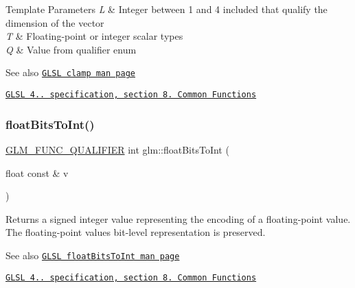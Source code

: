 \begin{DoxyTemplParams}{Template Parameters}
{\em L} & Integer between 1 and 4 included that qualify the dimension of the vector \\
\hline
{\em T} & Floating-\/point or integer scalar types \\
\hline
{\em Q} & Value from qualifier enum\\
\hline
\end{DoxyTemplParams}
\begin{DoxySeeAlso}{See also}
\href{http://www.opengl.org/sdk/docs/manglsl/xhtml/clamp.xml}{\tt G\+L\+SL clamp man page} 

\href{http://www.opengl.org/registry/doc/GLSLangSpec.4.20.8.pdf}{\tt G\+L\+SL 4.. specification, section 8. Common Functions} 
\end{DoxySeeAlso}
\mbox{\label{group__core__func__common_gadc6a536a7bef046c3293d2ccad6d9ca2}} 
\subsubsection{\texorpdfstring{float\+Bits\+To\+Int()}{floatBitsToInt()}\hspace{0.1cm}{\footnotesize\ttfamily [1/2]}}
{\footnotesize\ttfamily \hyperlink{setup_8hpp_a33fdea6f91c5f834105f7415e2a64407}{G\+L\+M\+\_\+\+F\+U\+N\+C\+\_\+\+Q\+U\+A\+L\+I\+F\+I\+ER} int glm\+::float\+Bits\+To\+Int (\begin{DoxyParamCaption}\item[{float const \&}]{v }\end{DoxyParamCaption})}

Returns a signed integer value representing the encoding of a floating-\/point value. The floating-\/point value\textquotesingle{}s bit-\/level representation is preserved.

\begin{DoxySeeAlso}{See also}
\href{http://www.opengl.org/sdk/docs/manglsl/xhtml/floatBitsToInt.xml}{\tt G\+L\+SL float\+Bits\+To\+Int man page} 

\href{http://www.opengl.org/registry/doc/GLSLangSpec.4.20.8.pdf}{\tt G\+L\+SL 4.. specification, section 8. Common Functions} 
\end{DoxySeeAlso}
\mbox{\label{group__core__func__common_ga99f7d62f78ac5ea3b49bae715c9488ed}} 
